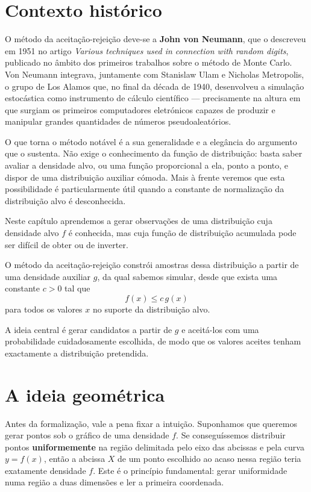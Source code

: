 \documentclass[
  portuguese,
  11pt,
  openany]{book}
\begin{document}
\section{Contexto histórico}\label{contexto-histuxf3rico}

O método da aceitação-rejeição deve-se a \textbf{John von Neumann}, que o descreveu
em 1951 no artigo \emph{Various techniques used in connection with random digits},
publicado no âmbito dos primeiros trabalhos sobre o método de Monte Carlo. Von
Neumann integrava, juntamente com Stanislaw Ulam e Nicholas Metropolis, o grupo
de Los Alamos que, no final da década de 1940, desenvolveu a simulação
estocástica como instrumento de cálculo científico --- precisamente na altura em
que surgiam os primeiros computadores eletrónicos capazes de produzir e
manipular grandes quantidades de números pseudoaleatórios.

O que torna o método notável é a sua generalidade e a elegância do argumento
que o sustenta. Não exige o conhecimento da função de distribuição: basta saber
avaliar a densidade alvo, ou uma função proporcional a ela, ponto a ponto, e
dispor de uma distribuição auxiliar cómoda. Mais à frente veremos que esta
possibilidade é particularmente útil quando a constante de normalização da
distribuição alvo é desconhecida.

Neste capítulo aprendemos a gerar observações de uma distribuição cuja densidade
alvo \(f\) é conhecida, mas cuja função de distribuição acumulada pode ser
difícil de obter ou de inverter.

O método da aceitação-rejeição constrói amostras dessa distribuição a partir de
uma densidade auxiliar \(g\), da qual sabemos simular, desde que exista uma
constante \(c>0\) tal que
\[
f(x) \leq c\,g(x)
\]
para todos os valores \(x\) no suporte da distribuição alvo.

A ideia central é gerar candidatos a partir de \(g\) e aceitá-los com uma
probabilidade cuidadosamente escolhida, de modo que os valores aceites tenham
exactamente a distribuição pretendida.

\section{A ideia geométrica}\label{a-ideia-geomuxe9trica}

Antes da formalização, vale a pena fixar a intuição. Suponhamos que queremos
gerar pontos sob o gráfico de uma densidade \(f\). Se conseguíssemos distribuir
pontos \textbf{uniformemente} na região delimitada pelo eixo das abcissas e pela
curva \(y = f(x)\), então a abcissa \(X\) de um ponto escolhido ao acaso nessa
região teria exatamente densidade \(f\). Este é o princípio fundamental: gerar
uniformidade numa região a duas dimensões e ler a primeira coordenada.
\end{document}
